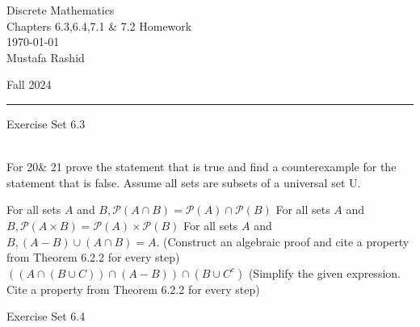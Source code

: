 \documentclass[12pt,letterpaper, onecolumn]{exam}
\begin{document}
	
	\begingroup  
	\noindent\LARGE Discrete Mathematics\\
	\noindent\LARGE Chapters 6.3,6.4,7.1 \& 7.2 Homework\\
	\noindent\large \today\\
	\noindent\large Mustafa Rashid\par
	\noindent\large Fall 2024\par
	\endgroup
	\rule{\textwidth}{0.4pt}
	\pointsdroppedatright
	\printanswers
	\renewcommand{\solutiontitle}{\noindent\textbf{Ans:}\enspace}  
	
	\centerline{Exercise Set 6.3}\\
	\noindent For 20\& 21 prove the statement that is true and find a counterexample for the statement that is false. Assume all sets are subsets of a universal set U.
\begin{questions}
	\setcounter{question}{19}\question For all sets $A$ and $B, \mathscr{P}(A \cap B)=\mathscr{P}(A)\cap \mathscr{P}(B)$
	\setcounter{question}{20}\question For all sets $A$ and $B, \mathscr{P}(A \times B)=\mathscr{P}(A)\times \mathscr{P}(B)$
	\setcounter{question}{31}\question For all sets $A$ and $B, (A-B)\cup (A\cap B)=A.$ (Construct an algebraic proof and cite a property from Theorem 6.2.2 for every step)
	\setcounter{question}{42}\question $((A\cap (B\cup C))\cap(A-B))\cap (B \cup C^c)$ (Simplify the given expression. Cite a property from
	Theorem 6.2.2 for every step)
\end{questions}
	\centerline{Exercise Set 6.4}
\end{document}
